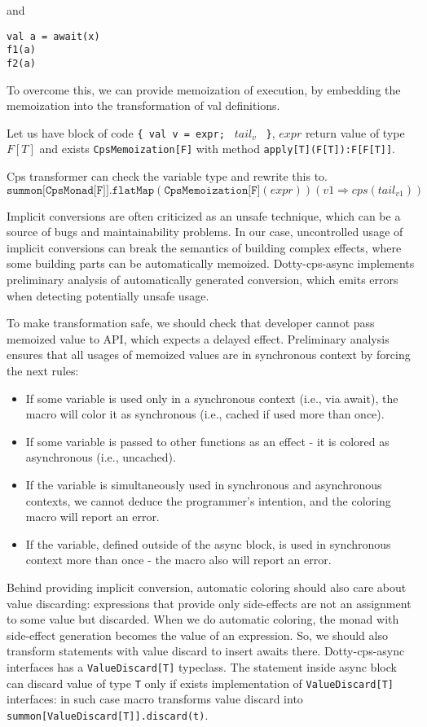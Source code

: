 \documentclass{llncs}
\begin{document}
and
\begin{lstlisting}
val a = await(x)
f1(a)
f2(a)
\end{lstlisting}    

   To overcome this, we can provide memoization of execution, by embedding the memoization into the transformation of val definitions.  

 Let us have block of code \lstinline[basicstyle=\small]|{ val v = expr; | $tail_v$ \lstinline| }|, $expr$ return value of type $F[T]$ and exists \lstinline|CpsMemoization[F]| with method \lstinline|apply[T](F[T]):F[F[T]]|.

   Cps transformer can check the variable type and rewrite this to.
    $$
      \texttt{summon[CpsMonad[F]]}.\texttt{flatMap}(
              \texttt{CpsMemoization[F]}(expr))( v1 \Rightarrow cps(tail_{v1}) )
    $$
\normalsize

Implicit conversions are often criticized as an unsafe technique, which can be a source of bugs and maintainability problems. In our case, uncontrolled usage of implicit conversions can break the semantics of building complex effects, where some building parts can be automatically memoized.   Dotty-cps-async implements preliminary analysis of automatically generated conversion, which emits errors when detecting potentially unsafe usage.  

 To make transformation safe, we should check that developer cannot pass memoized value to API, which expects a delayed effect.  Preliminary analysis ensures that all usages of memoized values are in synchronous context by forcing the next rules:

\begin{itemize}
 \item If some variable is used only in a synchronous context (i.e., via await), the macro will color it as synchronous (i.e., cached if used more than once).
 \item If some variable is passed to other functions as an effect - it is colored as asynchronous (i.e., uncached).
 \item If the variable is simultaneously used in synchronous and asynchronous contexts, we cannot deduce the programmer’s intention, and the coloring macro will report an error.
 \item If the variable, defined outside of the async block, is used in synchronous context more than once - the macro also will report an error.
\end{itemize}
  
 Behind providing implicit conversion, automatic coloring should also care about value discarding: expressions that provide only side-effects are not an assignment to some value but discarded. When we do automatic coloring, the monad with side-effect generation becomes the value of an expression.  So, we should also transform statements with value discard to insert awaits there.  
Dotty-cps-async interfaces has a \lstinline|ValueDiscard[T]| typeclass.  The statement inside async block can discard value of type \lstinline[basicstyle=\small]|T| only if exists implementation of \lstinline|ValueDiscard[T]| interfaces: in such case macro transforms value discard into \lstinline|summon[ValueDiscard[T]].discard(t)|.
\end{document}
